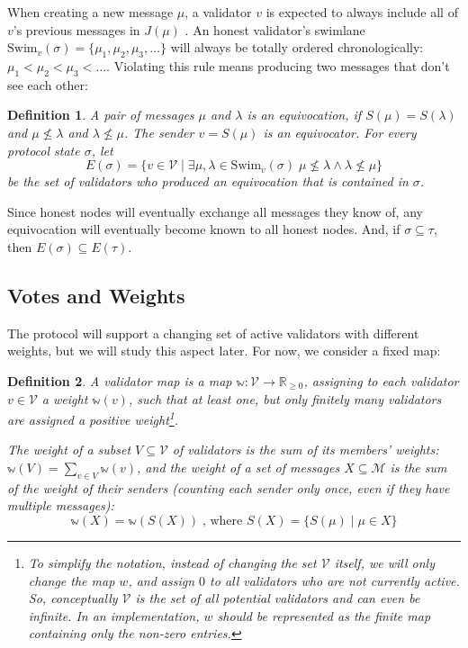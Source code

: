 \documentclass[12pt]{article}
\newtheorem{definition}{Definition}
\begin{document}
When creating a new message $\mu$, a validator $v$ is expected to always include all of $v$'s previous messages in $J(\mu)$ .  An honest validator's swimlane $\mathrm{Swim}_v(\sigma) = \{\mu_1, \mu_2, \mu_3, \ldots \}$ will always be totally ordered chronologically: $\mu_1 < \mu_2 < \mu_3 < \ldots$. Violating this rule means producing two messages that don't see each other:

\begin{definition}
A pair of messages $\mu$ and $\lambda$ is an \emph{equivocation}, if $S(\mu) = S(\lambda)$ and $\mu \not\leq \lambda$ and $\lambda \not\leq \mu$. The sender $v = S(\mu)$ is an \emph{equivocator}. For every protocol state $\sigma$, let
$$E(\sigma) = \{v\in\mathcal{V} \mid \exists \mu, \lambda \in \mathrm{Swim}_v(\sigma)\; \mu \not\leq \lambda \wedge \lambda \not\leq \mu\}$$
be the set of validators who produced an equivocation that is contained in $\sigma$.
\end{definition}

Since honest nodes will eventually exchange all messages they know of, any equivocation will eventually become known to all honest nodes. And, if $\sigma \subseteq \tau$, then $E(\sigma) \subseteq E(\tau)$.


\subsection{Votes and Weights}

The protocol will support a changing set of active validators with different weights, but we will study this aspect later. For now, we consider a fixed map:

\begin{definition}
  A \emph{validator map} is a map $\mathbb{w}: \mathcal{V} \rightarrow \mathbb{R}_{\geq 0}$, assigning to each validator $v \in \mathcal{V}$ a \emph{weight} $\mathbb{w}(v)$, such that at least one, but only finitely many validators are assigned a positive weight\footnote{To simplify the notation, instead of changing the set $\mathcal{V}$ itself, we will only change the map $w$, and assign $0$ to all validators who are not currently active. So, conceptually $\mathcal{V}$ is the set of all \emph{potential} validators and can even be infinite. In an implementation, $w$ should be represented as the finite map containing only the non-zero entries.}.

  The \emph{weight} of a subset $V \subseteq \mathcal{V}$ of validators is the sum of its members' weights: $\mathbb{w}(V) = \sum_{v \in V} \mathbb{w}(v)$, and the \emph{weight} of a set of messages $X \subseteq \mathcal{M}$ is the sum of the weight of their senders (counting each sender only once, even if they have multiple messages):
  $$\mathbb{w}(X) = \mathbb{w}(S(X)) \;\text{, where } S(X) = \{ S(\mu) \mid \mu \in X\}$$
\end{definition}
\end{document}
